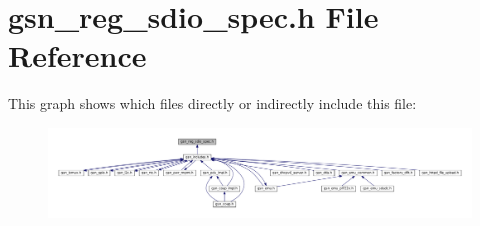 \hypertarget{a00571}{
\section{gsn\_\-reg\_\-sdio\_\-spec.h File Reference}
\label{a00571}
}
This graph shows which files directly or indirectly include this file:
\nopagebreak
\begin{figure}[H]
\begin{center}
\leavevmode
\includegraphics[width=400pt]{a00808}
\end{center}
\end{figure}
